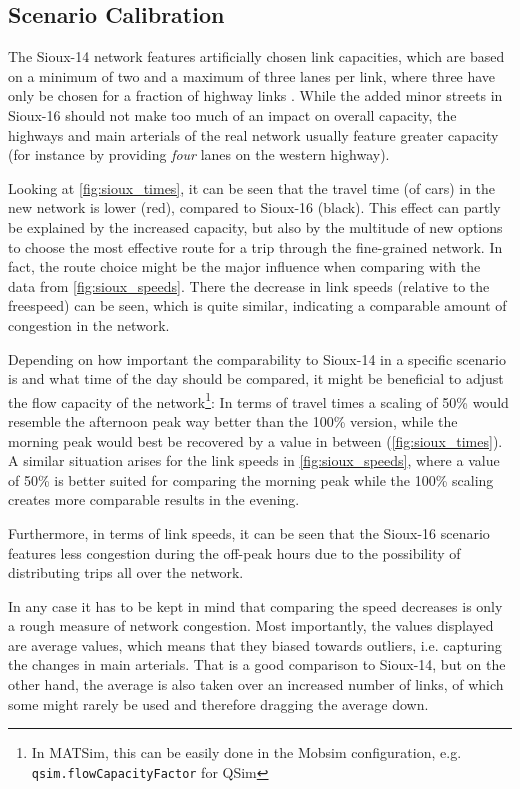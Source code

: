\subsection{Scenario Calibration}

The Sioux-14 network features artificially chosen link capacities, which are based
on a minimum of two and a maximum of three lanes per link, where three have only
be chosen for a fraction of highway links \citep{Chakirov2014}. While the added
minor streets in Sioux-16 should not make too much of an impact on overall
capacity, the highways and main arterials of the real network usually feature
greater capacity (for instance by providing \textit{four} lanes on the western highway).

Looking at \cref{fig:sioux_times}, it can be seen that the travel time (of cars) in
the new network is lower (red), compared to Sioux-16 (black). This effect can partly
be explained by the increased capacity, but also by the multitude of new options
to choose the most effective route for a trip through the fine-grained network. In
fact, the route choice might be the major influence when comparing with the data
from \cref{fig:sioux_speeds}. There the decrease in link speeds (relative to the freespeed) can be seen, which
is quite similar, indicating a comparable amount of congestion in the network.

Depending on how important the comparability to Sioux-14 in a specific scenario
is and what time of the day should be compared, it might be beneficial to adjust
the flow capacity of the network\footnote{In MATSim, this can be easily done
in the Mobsim configuration, e.g. \texttt{qsim.flowCapacityFactor} for QSim}:
In terms of travel times a scaling of 50\% would resemble the afternoon peak
way better than the 100\% version, while the morning peak would best be recovered
by a value in between (\cref{fig:sioux_times}). A similar situation arises for the
link speeds in \cref{fig:sioux_speeds}, where a value of 50\% is better suited for
comparing the morning peak while the 100\% scaling creates more comparable
results in the evening.

Furthermore, in terms of link speeds, it can be seen that the Sioux-16 scenario
features less congestion during the off-peak hours due to the possibility of
distributing trips all over the network.

In any case it has to be kept in mind that comparing the speed decreases is only
a rough measure of network congestion. Most importantly, the values displayed are
average values, which means that they biased towards outliers, i.e. capturing the
changes in main arterials. That is a good comparison to Sioux-14, but on the other
hand, the average is also taken over an increased number of links, of which some might rarely be
used and therefore dragging the average down.

